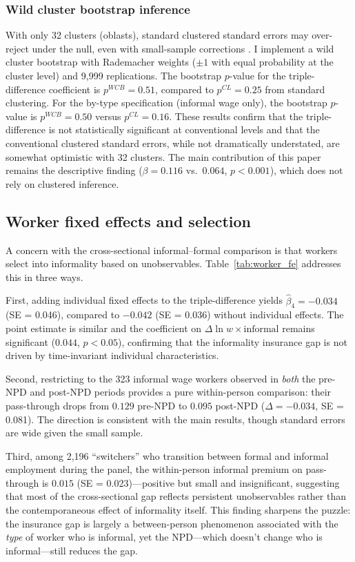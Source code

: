\documentclass[12pt]{article}
\begin{document}
\subsubsection{Wild cluster bootstrap inference}

With only 32 clusters (oblasts), standard clustered standard errors may over-reject under the null, even with small-sample corrections \citep{CameronGelbachMiller2008}. I implement a wild cluster bootstrap with Rademacher weights ($\pm 1$ with equal probability at the cluster level) and 9,999 replications. The bootstrap $p$-value for the triple-difference coefficient is $p^{WCB} = 0.51$, compared to $p^{CL} = 0.25$ from standard clustering. For the by-type specification (informal wage only), the bootstrap $p$-value is $p^{WCB} = 0.50$ versus $p^{CL} = 0.16$. These results confirm that the triple-difference is not statistically significant at conventional levels and that the conventional clustered standard errors, while not dramatically understated, are somewhat optimistic with 32 clusters. The main contribution of this paper remains the descriptive finding ($\beta = 0.116$ vs.\ $0.064$, $p < 0.001$), which does not rely on clustered inference.

\subsection{Worker fixed effects and selection}

A concern with the cross-sectional informal--formal comparison is that workers select into informality based on unobservables. Table~\ref{tab:worker_fe} addresses this in three ways.

First, adding individual fixed effects to the triple-difference yields $\hat{\beta}_4 = -0.034$ (SE = 0.046), compared to $-0.042$ (SE = 0.036) without individual effects. The point estimate is similar and the coefficient on $\Delta \ln w \times \text{informal}$ remains significant ($0.044$, $p < 0.05$), confirming that the informality insurance gap is not driven by time-invariant individual characteristics.

Second, restricting to the 323 informal wage workers observed in \textit{both} the pre-NPD and post-NPD periods provides a pure within-person comparison: their pass-through drops from $0.129$ pre-NPD to $0.095$ post-NPD ($\Delta = -0.034$, SE = 0.081). The direction is consistent with the main results, though standard errors are wide given the small sample.

Third, among 2,196 ``switchers'' who transition between formal and informal employment during the panel, the within-person informal premium on pass-through is $0.015$ (SE = 0.023)---positive but small and insignificant, suggesting that most of the cross-sectional gap reflects persistent unobservables rather than the contemporaneous effect of informality itself. This finding sharpens the puzzle: the insurance gap is largely a between-person phenomenon associated with the \textit{type} of worker who is informal, yet the NPD---which doesn't change who is informal---still reduces the gap.
\end{document}
